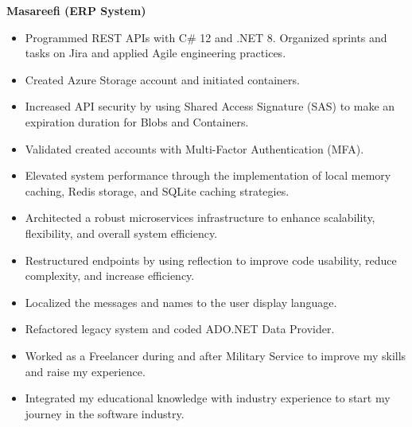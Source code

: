 


{\bfseries Masareefi (ERP System)}
\begin{itemize}
    \item Programmed REST APIs with C\# 12 and .NET 8. Organized sprints and tasks on Jira and applied Agile engineering practices.
    \item Created Azure Storage account and initiated containers.
    \item Increased API security by using Shared Access Signature (SAS) to make an expiration duration for Blobs and Containers.
    \item Validated created accounts with Multi-Factor Authentication (MFA).
    \item Elevated system performance through the implementation of local memory caching, Redis storage, and SQLite caching strategies.
    \item Architected a robust microservices infrastructure to enhance scalability, flexibility, and overall system efficiency.
    \item Restructured endpoints by using reflection to improve code usability, reduce complexity, and increase efficiency.
    \item Localized the messages and names to the user display language.
    \item Refactored legacy system and coded ADO.NET Data Provider.
\end{itemize}

\divider

\begin{itemize}
    \item Worked as a Freelancer during and after Military Service to improve my skills and raise my experience.
    \item Integrated my educational knowledge with industry experience to start my journey in the software industry.
\end{itemize}

